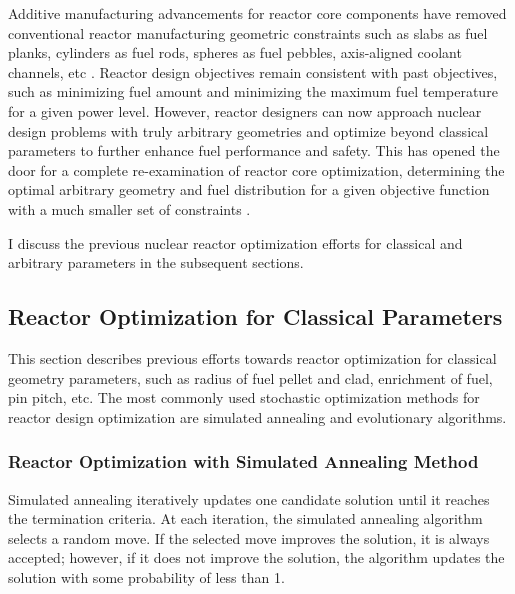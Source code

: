 Additive manufacturing advancements for reactor core components have
removed conventional reactor manufacturing geometric constraints such as slabs as fuel 
planks, cylinders as fuel rods, spheres as fuel pebbles, axis-aligned coolant 
channels, etc  \cite{sobes_artificial_2020}.
Reactor design objectives remain consistent with past objectives, such as 
minimizing fuel amount and minimizing the maximum fuel temperature for a given 
power level.
However, reactor designers can now approach nuclear design problems with truly 
arbitrary geometries and optimize beyond classical parameters to further enhance 
fuel performance and safety.
This has opened the door for a complete re-examination of reactor core 
optimization, determining the optimal arbitrary geometry 
and fuel distribution for a given objective function with a much smaller set of 
constraints \cite{sobes_artificial_2020}. 

I discuss the previous nuclear reactor optimization efforts for classical and 
arbitrary parameters in the subsequent sections.

\subsection{Reactor Optimization for Classical Parameters}
This section describes previous efforts towards reactor optimization for classical 
geometry parameters, such as radius of fuel pellet and clad, enrichment of fuel, 
pin pitch, etc. 
The most commonly used stochastic optimization methods for reactor design 
optimization are simulated annealing and evolutionary algorithms. 

\subsubsection{Reactor Optimization with Simulated Annealing Method}
Simulated annealing iteratively updates one candidate solution until it reaches 
the termination criteria. 
At each iteration, the simulated annealing algorithm selects a random move. 
If the selected move improves the solution, it is always accepted; however,  
if it does not improve the solution, the algorithm updates the solution with 
some probability of less than 1.

